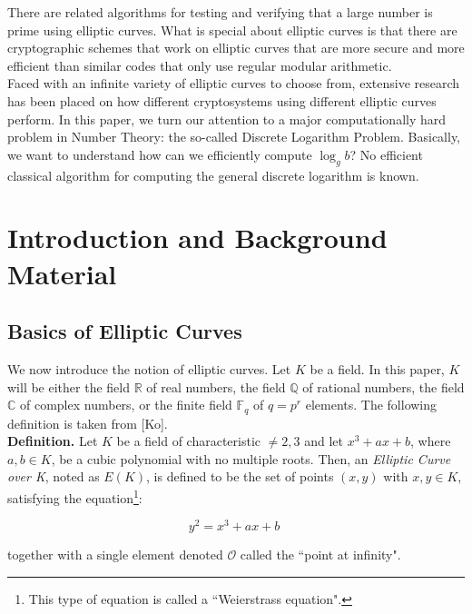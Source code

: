 \documentclass[12pt]{article}
\newcommand{\R}{\mathbb{R}}
\newcommand{\F}{\mathbb{F}}
\newcommand{\Q}{\mathbb{Q}}
\newcommand{\C}{\mathbb{C}}
\begin{document}
There are related algorithms for testing and verifying that a large number is prime using elliptic curves. What is special about elliptic curves is that there are cryptographic schemes that work on elliptic curves that are more secure and more efficient than similar codes that only use regular modular arithmetic.  \\

Faced with an infinite variety of elliptic curves to choose from, extensive research has been placed on how different cryptosystems using different elliptic curves perform. In this paper, we turn our attention to a major computationally hard problem in Number Theory: the so-called Discrete Logarithm Problem. Basically, we want to understand how can we efficiently compute $\log_gb$? No efficient classical algorithm for computing the general discrete logarithm is known. 

\section{Introduction and Background Material}

\subsection{Basics of Elliptic Curves}

We now introduce the notion of elliptic curves. Let $K$ be a field. In this paper, $K$ will be either the field $\R$ of real numbers, the field $\Q$ of rational numbers, the field $\C$ of complex numbers, or the finite field $\F_q$ of $q=p^r$ elements. The following definition is taken from [Ko].\\

{\bf Definition.} Let $K$ be a field of characteristic  $\neq 2,3$ and let $x^3 + ax + b$, where $a,b \in K$, be a cubic polynomial with no multiple roots. Then, an \emph{Elliptic Curve over K}, noted as $E(K)$, is defined to be the set of points $(x,y)$ with $x,y \in K$, satisfying the equation\footnote[1]{This type of equation is called a ``Weierstrass equation".}: 

\begin{equation}
y^2 = x^3 + ax + b\;
\end{equation}

together with a single element denoted $\mathcal{O}$ called the ``point at infinity". \\
\end{document}
